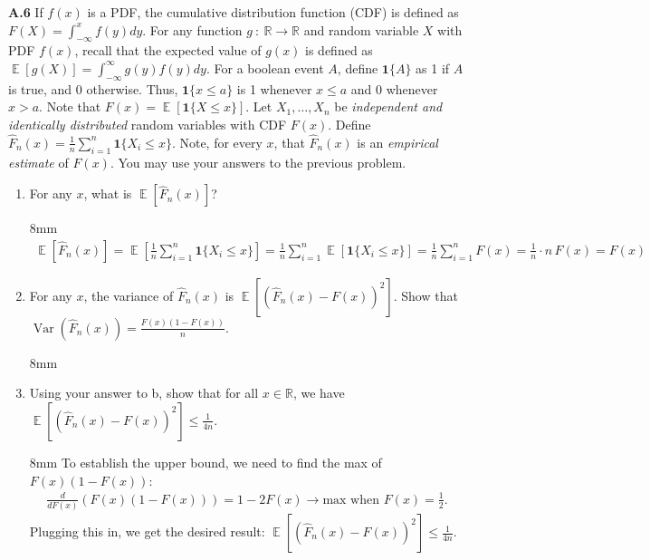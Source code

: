 \documentclass{article}
\newcommand{\vect}[1]{\boldsymbol{#1}} %
\DeclareMathOperator{\E}{\mathbb{E}}
\DeclareMathOperator{\var}{Var}
\newenvironment{solution}{\begin{adjustwidth}{8mm}{}}{\end{adjustwidth}}
\begin{document}
\textbf{A.6}
If $f(x)$ is a PDF, the cumulative distribution function (CDF) is defined as $F(X)=\int_{-\infty}^x f(y)dy$.
For any function $g ~:~ \mathbb{R} \to \mathbb{R}$ and random variable $X$ with PDF $f(x)$, recall that the expected value of $g(x)$ is defined as $\E[g(X)] = \int_{-\infty}^{\infty} g(y)f(y) dy$.
For a boolean event $A$, define $\vect{1}\{A\}$ as 1 if $A$ is true, and 0 otherwise.
Thus, $\vect{1}\{x \leq a\}$ is 1 whenever $x \leq a$ and 0 whenever $x > a$.
Note that $F(x) = \E[\vect{1}\{X \leq x\}]$.
Let $X_1, \dots, X_n$ be \textit{independent and identically distributed} random variables with CDF $F(x)$.
Define $\hat{F}_n(x) = \frac{1}{n} \sum_{i=1}^n \vect{1}\{X_i \leq x\}$.
Note, for every $x$, that $\hat{F}_n(x)$ is an \textit{empirical estimate} of $F(x)$.
You may use your answers to the previous problem.

\begin{enumerate}
        \item For any $x$, what is $\E[\hat{F}_n(x)]$?
        \begin{solution}
                \vspace{-5mm}
                \begin{align*}
                        \E[\hat{F}_n(x)] 
                        = \E[\frac{1}{n} \sum_{i=1}^n \vect{1}\{X_i \leq x\}]
                        = \frac{1}{n} \sum_{i=1}^n \E[\vect{1}\{X_i \leq x\}]
                        = \frac{1}{n} \sum_{i=1}^n F(x)
                        = \frac{1}{n} \cdot n \, F(x)
                        = F(x)                        
                \end{align*}
        \end{solution}
        \item For any $x$, the variance of $\hat{F}_n(x)$ is $\E[(\hat{F}_n(x) - F(x))^2]$.
                Show that $\var(\hat{F}_n(x)) = \frac{F(x)(1-F(x))}{n}$.
        \begin{solution}
                
        \end{solution}
        \item Using your answer to b, show that for all $x \in \mathbb{R}$, we have $\E[(\hat{F}_n(x) - F(x))^2] \leq \frac{1}{4n}$.
        \begin{solution}
                To establish the upper bound, we need to find the max of $F(x)(1-F(x))$:
                \begin{align*}
                        \frac{d}{dF(x)}(F(x)(1-F(x))) = 1 - 2 F(x) 
                        \longrightarrow \text{max when } F(x) = \frac{1}{2}.
                \end{align*}
                Plugging this in, we get the desired result: $\E[(\hat{F}_n(x) - F(x))^2] \leq \frac{1}{4n}$.
        \end{solution}
\end{enumerate}
\end{document}
